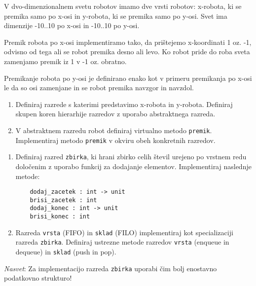 \begin{ex}
  V dvo-dimenzionalnem svetu robotov imamo dve vrsti robotov:
  x-robota, ki se premika samo po x-osi in y-robota, ki se premika
  samo po y-osi. Svet ima dimenzije -10..10 po x-osi in -10..10 po
  y-osi.

  Premik robota po x-osi implementiramo tako, da pri\v stejemo
  x-koordinati 1 oz. -1, odvisno od tega ali se robot premika desno
  ali levo. Ko robot pride do roba sveta zamenjamo premik iz 1 v -1
  oz. obratno.

  Premikanje robota po y-osi je definirano enako kot v primeru
  premikanja po x-osi le da so osi zamenjane in se robot premika
  navzgor in navzdol.

  \begin{enumerate}
  \item Definiraj razrede s katerimi predstavimo x-robota in
    y-robota. Definiraj skupen koren hierarhije razredov z uporabo
    abstraktnega razreda.

  \item V abstraktnem razredu robot definiraj virtualno metodo
    \texttt{premik}. Implementiraj metodo \texttt{premik} v
    okviru obeh konkretnih razredov.
  \end{enumerate}


\end{ex} 
\begin{ex}

  \begin{enumerate}
  \item Definiraj razred \texttt{zbirka}, ki hrani zbirko celih \v
    stevil urejeno po vrstnem redu dolo\v cenim z uporabo funkcij za
    dodajanje elementov. Implementiraj naslednje metode:

    \begin{verbatim}
    dodaj_zacetek : int -> unit
    brisi_zacetek : int 
    dodaj_konec : int -> unit
    brisi_konec : int  
    \end{verbatim}

  \item Razreda \texttt{vrsta} (FIFO) in \texttt{sklad} (FILO)
    implementiraj kot specializaciji razreda
    \texttt{zbirka}. Definiraj ustrezne metode razredov \texttt{vrsta}
    (enqueue in dequeue) in \texttt{sklad} (push in pop).
  \end{enumerate}

  \emph{Nasvet}: Za implementacijo razreda \texttt{zbirka} uporabi \v
  cim bolj enostavno podatkovno strukturo!


\end{ex} 
